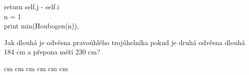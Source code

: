 \documentclass[addpoints,12pt]{exam}
\begin{document}
\begin{questions}
{\hspace*{0.6cm}\hspace*{0.6cm}\hspace*{0.6cm}return self.j - self.i\\
n = 1\\
print min(Houbogen(n)),}
\nopagebreak
\begin{choices}
\end{choices}
\question[2]
Jak dlouhá je odvěsna pravoúhlého trojúhelníka pokud je druhá odvěsna dlouhá 184 cm a přepona měří 230 cm?
\nopagebreak
\begin{choices}
 cm
 cm
 cm
 cm
 cm
 cm
\end{choices}
\end{questions}
\end{document}
